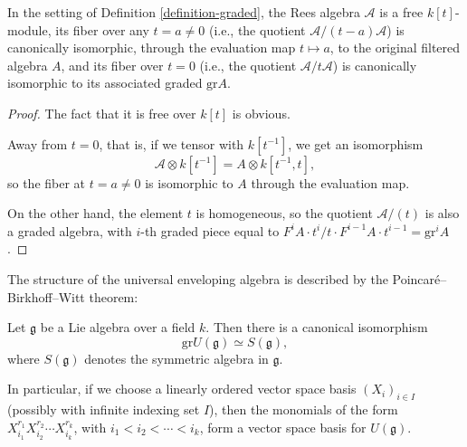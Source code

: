 \begin{lemma}
\label{lemma-Reesalgebra}
 In the setting of Definition \ref{definition-graded}, the Rees algebra $\mathcal A$ is a free $k[t]$-module, its fiber over any $t=a\ne 0$ (i.e., the quotient $\mathcal A/(t-a)\mathcal A$) is canonically isomorphic, through the evaluation map $t\mapsto a$, to the original filtered algebra $A$, and its fiber over $t=0$ (i.e., the quotient $\mathcal A/t\mathcal A$) is canonically isomorphic to its associated graded $\text{gr} A$.
\end{lemma}

\begin{proof}
 The fact that it is free over $k[t]$ is obvious.
 
 Away from $t=0$, that is, if we tensor with $k[t^{-1}]$, we get an isomorphism 
 $$ \mathcal A\otimes k[t^{-1}] = A \otimes k[t^{-1}, t],$$
 so the fiber at $t=a\ne 0$ is isomorphic to $A$ through the evaluation map.
 
 On the other hand, the element $t$ is homogeneous, so the quotient $\mathcal A/(t)$ is also a graded algebra, with $i$-th graded piece equal to $F^i A \cdot t^i / t\cdot F^{i-1} A \cdot t^{i-1}= \text{gr}^i A$. 
 
\end{proof}


The structure of the universal enveloping algebra is described by the Poincar\'e--Birkhoff--Witt theorem:


\begin{theorem}
\label{theorem-PBW}
Let $\mathfrak g$ be a Lie algebra over a field $k$. Then there is a canonical isomorphism 
\begin{equation}
 \label{equation-PBW}
\text{gr} U(\mathfrak g) \simeq S(\mathfrak g),
\end{equation}
where $S(\mathfrak g)$ denotes the symmetric algebra in $\mathfrak g$.

In particular, if we choose a linearly ordered vector space basis $(X_i)_{i\in I}$ (possibly with infinite indexing set $I$), then the monomials of the form $X_{i_1}^{r_1}X_{i_2}^{r_2}\cdots X_{i_k}^{r_k}$, with $i_1< i_2< \cdots< i_k$, form a vector space basis for $U(\mathfrak g)$.
\end{theorem}

